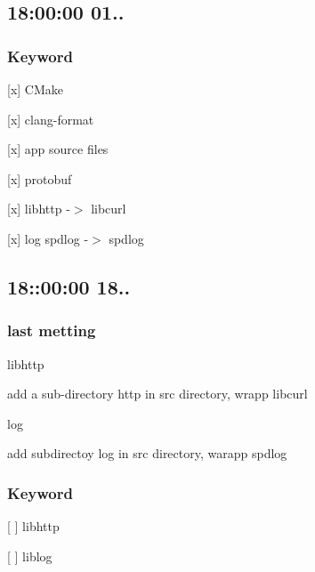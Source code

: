 \subsection*{18\+:00\+:00 01..}

\subsubsection*{Keyword}


\begin{DoxyItemize}
\item \mbox{[}x\mbox{]} C\+Make
\item \mbox{[}x\mbox{]} clang-\/format
\item \mbox{[}x\mbox{]} app source files
\item \mbox{[}x\mbox{]} protobuf
\item \mbox{[}x\mbox{]} libhttp -\/$>$ libcurl
\item \mbox{[}x\mbox{]} log spdlog -\/$>$ spdlog
\end{DoxyItemize}

\subsection*{18\+:\+:00\+:00 18..}

\subsubsection*{last metting}


\begin{DoxyItemize}
\item libhttp

add a sub-\/directory {\ttfamily http} in {\ttfamily src} directory, wrapp {\ttfamily libcurl}
\item log

add subdirectoy \textquotesingle{}log\textquotesingle{} in {\ttfamily src} directory, warapp {\ttfamily spdlog}
\end{DoxyItemize}

\subsubsection*{Keyword}


\begin{DoxyItemize}
\item \mbox{[} \mbox{]} libhttp
\item \mbox{[} \mbox{]} liblog 
\end{DoxyItemize}